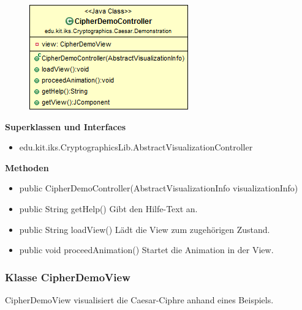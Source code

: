 \documentclass{article}
\begin{document}
      \begin{figure}[H]
        \centering
        \includegraphics{resources/edu-kit-iks-Cryptographics-Caesar-Demonstration-CipherDemoController}
      \end{figure}

      \textbf{Superklassen und Interfaces}
      \begin{itemize}
        \item edu.kit.iks.CryptographicsLib.AbstractVisualizationController
      \end{itemize}

      \textbf{Methoden}
      \begin{itemize}
        \item public CipherDemoController(AbstractVisualizationInfo visualizationInfo)
        \item public String getHelp() \newline
        Gibt den Hilfe-Text an.
        \item public String loadView() \newline
        Lädt die View zum zugehörigen Zustand.
        \item public void proceedAnimation() \newline
        Startet die Animation in der View.
      \end{itemize}

\subsubsection{Klasse CipherDemoView}
      CipherDemoView visualisiert die Caesar-Ciphre anhand eines Beispiels.
\end{document}
